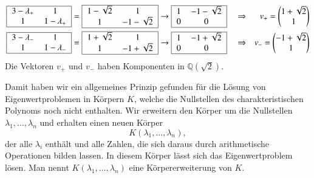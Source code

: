\[
\begin{aligned}
\begin{tabular}{|>{$}c<{$}>{$}c<{$}|}
\hline
3-\lambda_+&1          \\
1          &1-\lambda_+\\
\hline
\end{tabular}
&=
\begin{tabular}{|>{$}c<{$}>{$}c<{$}|}
\hline
1-\sqrt{2}& 1         \\
1         &-1-\sqrt{2}\\
\hline
\end{tabular}
\rightarrow
\begin{tabular}{|>{$}c<{$}>{$}c<{$}|}
\hline
1&-1-\sqrt{2}\\
0&0          \\
\hline
\end{tabular}
&&\Rightarrow&v_+=\begin{pmatrix}1+\sqrt{2}\\1\end{pmatrix}
\\
\begin{tabular}{|>{$}c<{$}>{$}c<{$}|}
\hline
3-\lambda_-&1          \\
1          &1-\lambda_-\\
\hline
\end{tabular}
&=
\begin{tabular}{|>{$}c<{$}>{$}c<{$}|}
\hline
1+\sqrt{2}& 1         \\
1         &-1+\sqrt{2}\\
\hline
\end{tabular}
\rightarrow
\begin{tabular}{|>{$}c<{$}>{$}c<{$}|}
\hline
1&-1+\sqrt{2}\\
0&0          \\
\hline
\end{tabular}
&&\Rightarrow&v_-=\begin{pmatrix}-1+\sqrt{2}\\1\end{pmatrix}
\end{aligned}
\]
Die Vektoren $v_+$ und $v_-$ haben Komponenten in $\mathbb Q(\!\sqrt{2})$.

Damit haben wir ein allgemeines Prinzip gefunden
für die Lösung von Eigenwertproblemen in Körpern $K$,
welche die Nullstellen des charakteristischen Polynoms noch
nicht enthalten. 
Wir erweitern den Körper um die Nullstellen $\lambda_1,\dots,\lambda_n$
und erhalten einen neuen Körper
\[
K(\lambda_1,\dots,\lambda_n),
\]
der alle $\lambda_i$ enthält und alle Zahlen, die sich daraus durch
arithmetische Operationen bilden lassen.
In diesem Körper lässt sich das Eigenwertproblem lösen.
Man nennt $K(\lambda_1,\dots,\lambda_n)$ eine Körpererweiterung von $K$.
%

